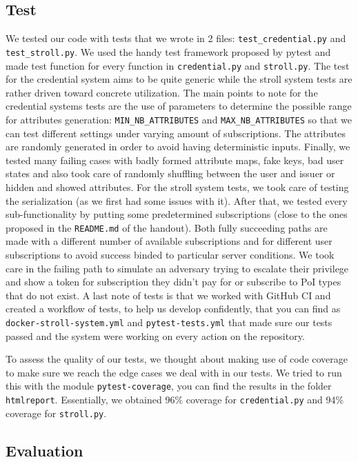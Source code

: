 \documentclass[10pt,conference,compsocconf]{IEEEtran}
\begin{document}
\subsection{Test}
We tested our code with tests that we wrote in 2 files: \texttt{test\_credential.py} and \texttt{test\_stroll.py}. We used the handy test framework proposed by pytest and made test function for every function in \texttt{credential.py} and \texttt{stroll.py}. The test for the credential system aims to be quite generic while the stroll system tests are rather driven toward concrete utilization. The main points to note for the credential systems tests are the use of parameters to determine the possible range for attributes generation: \texttt{MIN\_NB\_ATTRIBUTES} and \texttt{MAX\_NB\_ATTRIBUTES} so that we can test different settings under varying amount of subscriptions. The attributes are randomly generated in order to avoid having deterministic inputs. Finally, we tested many failing cases with badly formed attribute maps, fake keys, bad user states and also took care of randomly shuffling between the user and issuer or hidden and showed attributes. For the stroll system tests, we took care of testing the serialization (as we first had some issues with it). After that, we tested every sub-functionality by putting some predetermined subscriptions (close to the ones proposed in the \texttt{README.md} of the handout). Both fully succeeding paths are made with a different number of available subscriptions and for different user subscriptions to avoid success binded to particular server conditions. We took care in the failing path to simulate an adversary trying to escalate their privilege and show a token for subscription they didn't pay for or subscribe to PoI types that do not exist. A last note of tests is that we worked with GitHub CI and created a workflow of tests, to help us develop confidently, that you can find as \texttt{docker-stroll-system.yml} and \texttt{pytest-tests.yml} that made sure our tests passed and the system were working on every action on the repository.

To assess the quality of our tests, we thought about making use of code coverage to make sure we reach the edge cases we deal with in our tests. We tried to run this with the module \texttt{pytest-coverage}, you can find the results in the folder \texttt{htmlreport}. Essentially, we obtained 96\% coverage for \texttt{credential.py} and 94\% coverage for \texttt{stroll.py}. 
\subsection{Evaluation}
\end{document}
